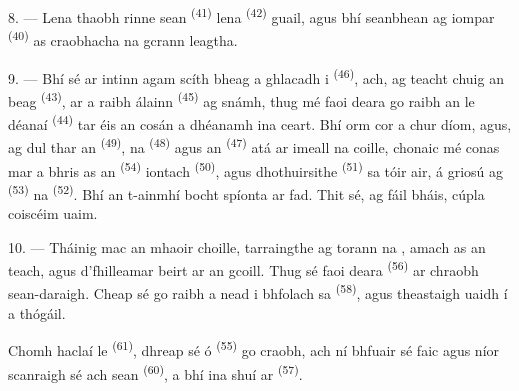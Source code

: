 8. --- Lena thaobh rinne  sean \textsuperscript{(41)} lena
  \textsuperscript{(42)} guail, agus bhí seanbhean
ag iompar  \textsuperscript{(40)}  as craobhacha na
gcrann leagtha.

\VUsaut{3.0mm}
\VUsaut{3.0mm}

9. --- Bhí sé ar intinn agam scíth bheag a ghlacadh i  \textsuperscript{(46)}, ach, ag teacht chuig an  beag
\textsuperscript{(43)}, ar a raibh  álainn \textsuperscript{(45)} ag
snámh, thug mé faoi deara go raibh an  le déanaí
\textsuperscript{(44)} tar éis an cosán a dhéanamh ina  ceart. Bhí orm
cor a chur díom, agus, ag dul thar an  \textsuperscript{(49)}, na
 \textsuperscript{(48)} agus an 
\textsuperscript{(47)} atá ar imeall na coille, chonaic mé conas mar a bhris as an 
\textsuperscript{(54)}  iontach \textsuperscript{(50)}, agus
 dhothuirsithe \textsuperscript{(51)}
sa tóir air, á griosú ag  \textsuperscript{(53)} na
 \textsuperscript{(52)}. Bhí an t-ainmhí bocht
spíonta ar fad. Thit sé, ag fáil bháis, cúpla coiscéim uaim.

10. --- Tháinig mac an mhaoir choille, tarraingthe ag torann na
, amach as an teach, agus d'fhilleamar beirt ar an gcoill.
Thug sé faoi deara  \textsuperscript{(56)} ar chraobh
sean-daraigh. Cheap sé go raibh a nead i bhfolach sa 
\textsuperscript{(58)}, agus theastaigh uaidh í a thógáil.

Chomh haclaí le  \textsuperscript{(61)}, dhreap sé ó
 \textsuperscript{(55)} go craobh, ach ní bhfuair sé faic agus níor
scanraigh sé ach  sean \textsuperscript{(60)}, a bhí ina shuí ar
 \textsuperscript{(57)}.
\VUsaut{4.0mm}
\VUfilet{22mm}
